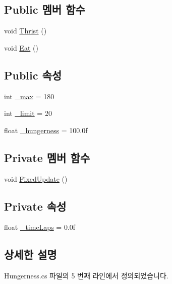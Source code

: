 \subsection*{Public 멤버 함수}
\begin{DoxyCompactItemize}
\item 
void \mbox{\hyperlink{class_hungerness_a3c2776ba20e8a72e763ad02ded86aad9}{Thrist}} ()
\item 
void \mbox{\hyperlink{class_hungerness_a84a1577cd9995fa6b719e14295e8ee7d}{Eat}} ()
\end{DoxyCompactItemize}
\subsection*{Public 속성}
\begin{DoxyCompactItemize}
\item 
int \mbox{\hyperlink{class_hungerness_a5879cd7fdf6d8b2c490507909f370d34}{\+\_\+max}} = 180
\item 
int \mbox{\hyperlink{class_hungerness_ac3295f7f5834a46713bf304a080ac16d}{\+\_\+limit}} = 20
\item 
float \mbox{\hyperlink{class_hungerness_abcd3f8c8cd69443a8c91a03c06e65d4a}{\+\_\+hungerness}} = 100.\+0f
\end{DoxyCompactItemize}
\subsection*{Private 멤버 함수}
\begin{DoxyCompactItemize}
\item 
void \mbox{\hyperlink{class_hungerness_a0d5665654ffa0599fa8d6eb9d86d4963}{Fixed\+Update}} ()
\end{DoxyCompactItemize}
\subsection*{Private 속성}
\begin{DoxyCompactItemize}
\item 
float \mbox{\hyperlink{class_hungerness_a673889b258306ea30e56d0c6546806af}{\+\_\+time\+Laps}} = 0.\+0f
\end{DoxyCompactItemize}


\subsection{상세한 설명}


Hungerness.\+cs 파일의 5 번째 라인에서 정의되었습니다.




